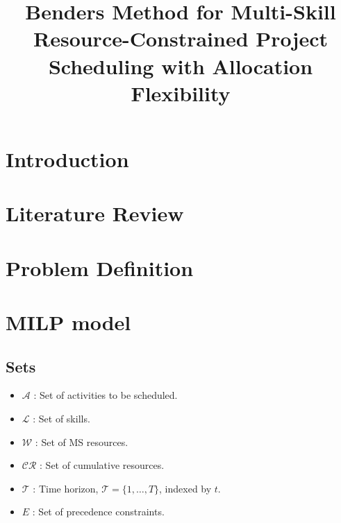 \documentclass[preprint, authoryear,11pt]{elsarticle}
\title{Benders Method for Multi-Skill Resource-Constrained Project Scheduling with Allocation Flexibility}
\begin{document}
\begin{abstract}

\end{abstract}

\begin{keyword}

\end{keyword}

\maketitle


\section{Introduction}

\section{Literature Review}
\label{sec:litrev}

\section{Problem Definition}
\label{sec:probdef}

\section{MILP model}
\label{sec:milp}

\subsection{Sets}
\begin{itemize}
    \item $\mathcal{A}$ : Set of activities to be scheduled.
    \item $\mathcal{L}$ : Set of skills.
    \item $\mathcal{W}$ : Set of MS resources.
    \item $\mathcal{CR}$ : Set of cumulative resources.
    \item $\mathcal{T}$ : Time horizon, $\mathcal{T} = \{1, \dots, T\}$, indexed by $t$.
    \item $E$ : Set of precedence constraints.
\end{itemize}
\end{document}
